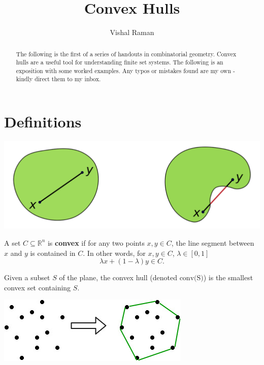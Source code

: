 \documentclass[11pt]{scrartcl}
\newcommand{\R}{\mathbb{R}}
\begin{document}
\title{Convex Hulls}
\author{Vishal Raman}
\maketitle
\begin{abstract}
The following is the first of a series of handouts in combinatorial geometry.  Convex hulls are a useful tool for understanding finite set systems.  The following is an exposition with some worked examples.  Any typos or mistakes found are my own - kindly direct them to my inbox.
\end{abstract}
\section{Definitions}
\begin{center}
\includegraphics[scale=0.5]{convex.png}
\end{center}
\begin{definition} A set $C \subseteq \R^n$ is \textbf{convex} if for any two points $x, y \in C$, the line segment between $x$ and $y$ is contained in $C$.  In other words, for $x, y \in C$, $\lambda \in [0, 1]$
$$\lambda x + (1 - \lambda) y \in C.$$
\end{definition}
\begin{definition}
Given a subset $S$ of the plane, the convex hull (denoted $\text{conv(S)}$) is the smallest convex set containing $S$.
\begin{center}
\includegraphics[scale=0.7]{convHull.jpg}
\end{center}
\end{definition}
\pagebreak
\end{document}
